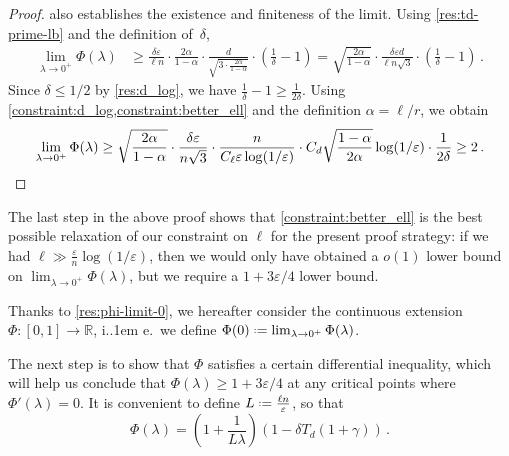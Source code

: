 \documentclass{theoretics}
\newcommand*\ie{i.\kern.1em e.\ }
\newcommand*{\define}{\mathrel{\vcenter{\baselineskip0.5ex \lineskiplimit0pt
                      \hbox{\scriptsize.}\hbox{\scriptsize.}}}%
                      =}
\newcommand{\bR}{\ensuremath{\mathbb{R}}}
\renewcommand{\epsilon}{\varepsilon}
\begin{document}
\begin{proof}
    also establishes the existence and finiteness of the limit. Using \cref{res:td-prime-lb} and the
    definition of~$\delta$,
    \begin{align*}
        \lim_{\lambda \to 0^+} \Phi(\lambda)
        &\ge \frac{\delta \epsilon}{\ell n} \cdot \frac{2\alpha}{1-\alpha}
            \cdot \frac{d}{\sqrt{3 \cdot \frac{2\alpha}{1-\alpha}}}
            \cdot \left(\frac{1}{\delta} - 1\right)
        = \sqrt{\frac{2\alpha}{1-\alpha}} \cdot
            \frac{\delta \epsilon d}{\ell n \sqrt{3}} \cdot \left(\frac{1}{\delta} - 1\right) \,.
    \end{align*}
    Since $\delta \le 1/2$ by \cref{res:d_log}, we have $\frac{1}{\delta} - 1 \ge
    \frac{1}{2\delta}$. Using \cref{constraint:d_log,constraint:better_ell} and the definition
    $\alpha = \ell/r$, we obtain
    \[
        \lim_{\lambda \to 0^+} \Phi(\lambda)
        \ge \sqrt{\frac{2\alpha}{1-\alpha}} \cdot
            \frac{\delta \epsilon}{n\sqrt{3}}
            \cdot \frac{n}{C_\ell \epsilon \log(1/\epsilon)}
            \cdot C_d \sqrt{\frac{1-\alpha}{2\alpha}} \log(1/\epsilon)
            \cdot \frac{1}{2\delta}
        \ge 2 \,. \qedhere
    \]
\end{proof}

\begin{remark}
\label{remark:no-better-parameter}
The last step in the above proof shows that \cref{constraint:better_ell} is the best possible
relaxation of our constraint on $\ell$ for the present proof strategy: if we had $\ell \gg
\tfrac{\epsilon}{n} \log(1/\epsilon)$, then we would only have obtained a $o(1)$ lower bound on
$\lim_{\lambda \to 0^+} \Phi(\lambda)$, but we require a $1 + 3\epsilon/4$ lower bound.
\end{remark}

Thanks to \cref{res:phi-limit-0}, we hereafter consider the continuous extension $\Phi : [0,1] \to
\bR$, \ie we define $\Phi(0) \define \lim_{\lambda \to 0^+} \Phi(\lambda)$.

The next step is to show that $\Phi$ satisfies a certain differential inequality, which will help us
conclude that $\Phi(\lambda) \ge 1 + 3\epsilon/4$ at any critical points where $\Phi'(\lambda) = 0$.
It is convenient to define $L \define \tfrac{\ell n}{\epsilon}$, so that
\[
  \Phi(\lambda) = \left(1 + \frac{1}{L \lambda}\right) (1 - \delta T_d(1+\gamma)) \,.
\]
\end{document}
